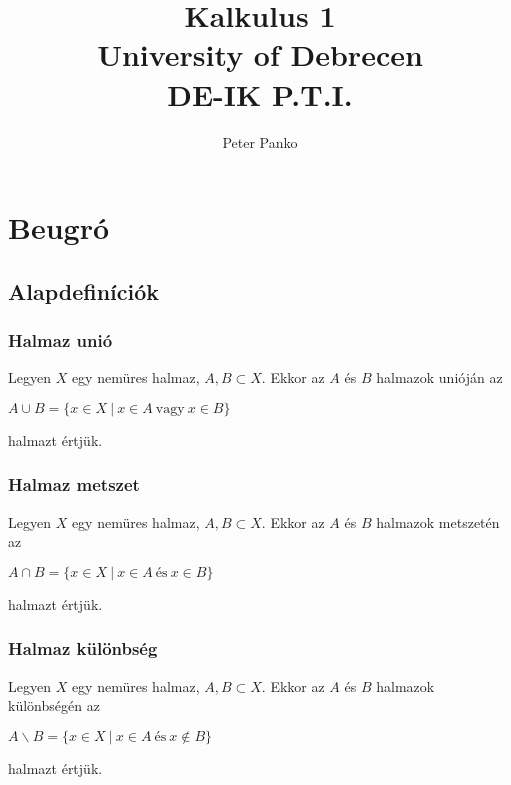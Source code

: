\documentclass[12pt]{article}
\title{\Huge Kalkulus 1 \\
\LARGE University of Debrecen \\
\large DE-IK P.T.I.}
\author{Peter Panko}
\begin{document}
\clearpage\maketitle
\thispagestyle{empty}
\newpage


\tableofcontents 

\newpage




\section{Beugró}


\subsection{Alapdefiníciók}

\subsubsection{Halmaz unió}

Legyen $X$ egy nemüres halmaz, $A, B \subset X$. Ekkor az $A$ és $B$ halmazok unióján az\\
\begin{center}
$A \cup B = \{x \in X\ |\ x \in A\ \text{vagy}\ x \in B\}$
\end{center}
halmazt értjük.

\subsubsection{Halmaz metszet}

Legyen $X$ egy nemüres halmaz, $A, B \subset X$. Ekkor az $A$ és $B$ halmazok metszetén az
\begin{center}
$A \cap B = \{x \in X\ |\ x \in A\ \text{és}\ x \in B\}$
\end{center}
halmazt értjük.

\subsubsection{Halmaz különbség}

Legyen $X$ egy nemüres halmaz, $A, B \subset X$. Ekkor az $A$ és $B$ halmazok különbségén az
\begin{center}
$A \backslash B = \{x \in X\ |\ x \in A\ \text{és}\ x \notin B\}$
\end{center}
halmazt értjük.
\end{document}
